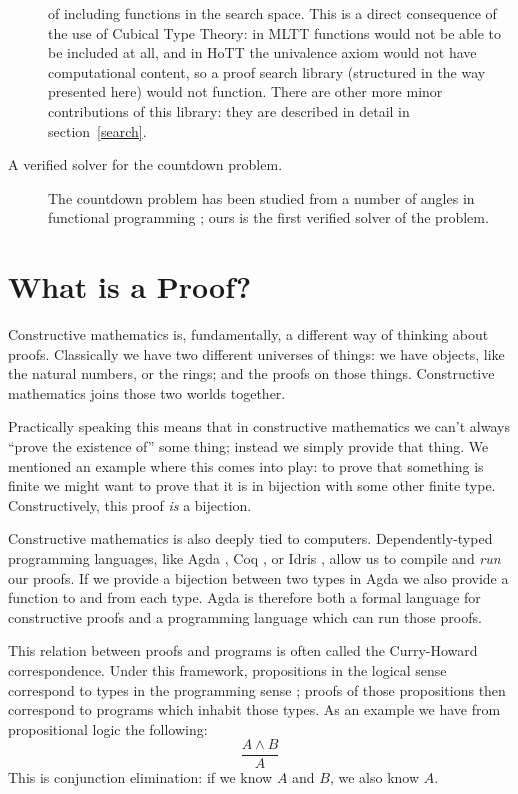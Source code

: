 \begin{description}
    of including functions in the search space.
    This is a direct consequence of the use of Cubical Type Theory: in MLTT
    functions would not be able to be included at all, and in HoTT the
    univalence axiom would not have computational content, so a proof search
    library (structured in the way presented here) would not function.
    There are other more minor contributions of this library: they are described
    in detail in section~\ref{search}.
  \item[A verified solver for the countdown problem.]
    The countdown problem \citep{huttonCountdownProblem2002} has been studied
    from a number of angles in functional programming
    \cite{birdCountdownCaseStudy2005}; ours is the first verified solver of the
    problem.
\end{description}


\section{What is a Proof?}
Constructive mathematics is, fundamentally, a different way of thinking about
proofs.
Classically we have two different universes of things: we have
objects, like the natural numbers, or the rings; and the proofs on those things.
Constructive mathematics joins those two worlds together.

Practically speaking this means that in constructive mathematics we can't
always ``prove the existence of'' some thing; instead we simply provide that
thing.
We mentioned an example where this comes into play: to prove that something is
finite we might want to prove that it is in bijection with some other finite
type.
Constructively, this proof \emph{is} a bijection.

Constructive mathematics is also deeply tied to computers.
Dependently-typed programming languages, like Agda
\citep{norellDependentlyTypedProgramming2008}, Coq
\citep{thecoqdevelopmentteamCoqProofAssistant2020}, or Idris
\citep{bradyIdrisGeneralpurposeDependently2013}, allow us to compile and
\emph{run} our proofs.
If we provide a bijection between two types in Agda we also provide a function
to and from each type.
Agda is therefore both a formal language for constructive proofs and a
programming language which can run those proofs.

This relation between proofs and programs is often called the Curry-Howard
correspondence.
Under this framework, propositions in the logical sense correspond to types in
the programming sense \citep{wadlerPropositionsTypes2015}; proofs of those
propositions then correspond to programs which inhabit those types.
As an example we have from propositional logic the following:
\begin{equation*}
  \frac{A \wedge B}{A}
\end{equation*}
This is conjunction elimination: if we know \(A\) and \(B\), we also know \(A\).


